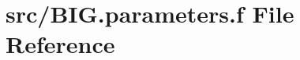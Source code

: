 \hypertarget{_b_i_g_8parameters_8f}{}\section{src/\+B\+I\+G.parameters.\+f File Reference}
\label{_b_i_g_8parameters_8f}
